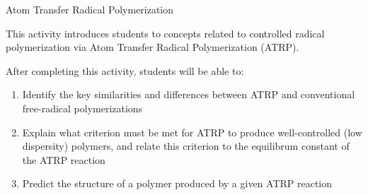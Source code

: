 %
%
%
%

\renewcommand{\figpath}{content/polymchem/livingpolyms/ATRP/figs}
\renewcommand{\labelbase}{ATRP}

\begin{activity}{Atom Transfer Radical Polymerization}

\begin{instructornotes}
	This activity introduces students to concepts related to controlled radical polymerization via Atom Transfer Radical Polymerization (ATRP).
	
	After completing this activity, students will be able to:
	\begin{enumerate}
		\item Identify the key similarities and differences between ATRP and conventional free-radical polymerizations		
		\item Explain what criterion must be met for ATRP to produce well-controlled (low dispersity) polymers, and relate this criterion to the equilibrum constant of the ATRP reaction
		\item Predict the structure of a polymer produced by a given ATRP reaction
	\end{enumerate}
	

\end{instructornotes}
\end{activity}
